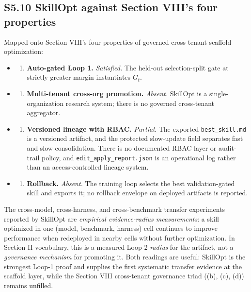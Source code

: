 \documentclass[
]{article}
\providecommand{\tightlist}{%
  \setlength{\itemsep}{0pt}\setlength{\parskip}{0pt}}
\begin{document}
\subsection{S5.10 SkillOpt against Section VIII's four
properties}\label{s5.10-skillopt-against-section-viiis-four-properties}

Mapped onto Section VIII's four properties of governed cross-tenant
scaffold optimization:

\begin{itemize}
\tightlist
\item
  \begin{enumerate}
  \def\labelenumi{(\alph{enumi})}
  \tightlist
  \item
    \textbf{Auto-gated Loop 1.} \emph{Satisfied.} The held-out
    selection-split gate at strictly-greater margin instantiates
    \(G_t\).
  \end{enumerate}
\item
  \begin{enumerate}
  \def\labelenumi{(\alph{enumi})}
  \setcounter{enumi}{1}
  \tightlist
  \item
    \textbf{Multi-tenant cross-org promotion.} \emph{Absent.} SkillOpt
    is a single-organization research system; there is no governed
    cross-tenant aggregator.
  \end{enumerate}
\item
  \begin{enumerate}
  \def\labelenumi{(\alph{enumi})}
  \setcounter{enumi}{2}
  \tightlist
  \item
    \textbf{Versioned lineage with RBAC.} \emph{Partial.} The exported
    \texttt{best\_skill.md} is a versioned artifact, and the protected
    slow-update field separates fast and slow consolidation. There is no
    documented RBAC layer or audit-trail policy, and
    \texttt{edit\_apply\_report.json} is an operational log rather than
    an access-controlled lineage system.
  \end{enumerate}
\item
  \begin{enumerate}
  \def\labelenumi{(\alph{enumi})}
  \setcounter{enumi}{3}
  \tightlist
  \item
    \textbf{Rollback.} \emph{Absent.} The training loop selects the best
    validation-gated skill and exports it; no rollback envelope on
    deployed artifacts is reported.
  \end{enumerate}
\end{itemize}

The cross-model, cross-harness, and cross-benchmark transfer experiments
reported by SkillOpt are \emph{empirical evidence-radius measurements}:
a skill optimized in one (model, benchmark, harness) cell continues to
improve performance when redeployed in nearby cells without further
optimization. In Section II vocabulary, this is a measured Loop-2
\emph{radius} for the artifact, not a \emph{governance mechanism} for
promoting it. Both readings are useful: SkillOpt is the strongest Loop-1
proof and supplies the first systematic transfer evidence at the
scaffold layer, while the Section VIII cross-tenant governance triad
((b), (c), (d)) remains unfilled.
\end{document}
